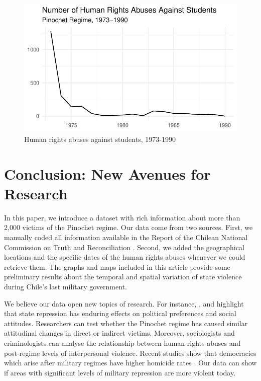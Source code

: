 \documentclass[12pt,a4paper,]{article}
\begin{document}
\begin{figure}

{\centering \includegraphics{article_files/figure-latex/time-trend-students-1} 

}

\caption{Human rights abuses against students, 1973-1990}\label{fig:time-trend-students}
\end{figure}

\vspace{.5cm}

\hypertarget{conclusion-new-avenues-for-research}{%
\section{Conclusion: New Avenues for
Research}\label{conclusion-new-avenues-for-research}}

In this paper, we introduce a dataset with rich information about more
than 2,000 victims of the Pinochet regime. Our data come from two
sources. First, we manually coded all information available in the
Report of the Chilean National Commission on Truth and Reconciliation
\citeyearpar{report1991}. Second, we added the geographical locations
and the specific dates of the human rights abuses whenever we could
retrieve them. The graphs and maps included in this article provide some
preliminary results about the temporal and spatial variation of state
violence during Chile's last military government.

We believe our data open new topics of research. For instance,
\citet{lupu2017legacy}, \citet{rozenas2017political} and
\citet{zhukov2018stalin} highlight that state repression has enduring
effects on political preferences and social attitudes. Researchers can
test whether the Pinochet regime has caused similar attitudinal changes
in direct or indirect victims. Moreover, sociologists and criminologists
can analyse the relationship between human rights abuses and post-regime
levels of interpersonal violence. Recent studies show that democracies
which arise after military regimes have higher homicide rates
\citep{frantz2018legacy, karstedt2006democracy}. Our data can show if
areas with significant levels of military repression are more violent
today.
\end{document}

